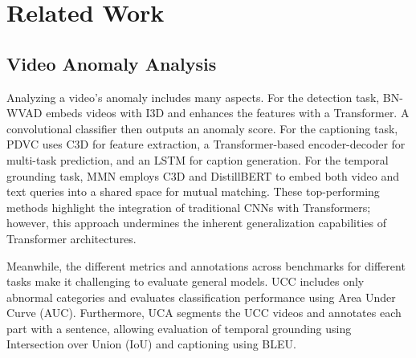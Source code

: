 \section{Related Work}
\label{sec:related_work}
 \subsection{Video Anomaly Analysis} 
   Analyzing a video's anomaly includes many aspects.
 For the detection task, BN-WVAD\cite{BN-WVAD} embeds videos with I3D\cite{I3D} and enhances the features with a Transformer. A convolutional classifier then outputs an anomaly score.
 For the captioning task, PDVC\cite{PDVC} uses C3D\cite{C3D} for feature extraction, a Transformer-based encoder-decoder for multi-task prediction, and an LSTM for caption generation.
 For the temporal grounding task, MMN\cite{MMN} employs C3D and DistillBERT\cite{DistilBERT} to embed both video and text queries into a shared space for mutual matching.
These top-performing methods highlight the integration of traditional CNNs with Transformers; however, this approach undermines the inherent generalization capabilities of Transformer architectures.
 
 Meanwhile, the different metrics and annotations across benchmarks for different tasks make it challenging to evaluate general models.
 UCC\cite{UCFCrime} includes only abnormal categories and evaluates classification performance using Area Under Curve (AUC). Furthermore, UCA\cite{UCA} segments the UCC videos and annotates each part with a sentence, allowing evaluation of temporal grounding using Intersection over Union (IoU) and captioning using BLEU\cite{BLEU}.




